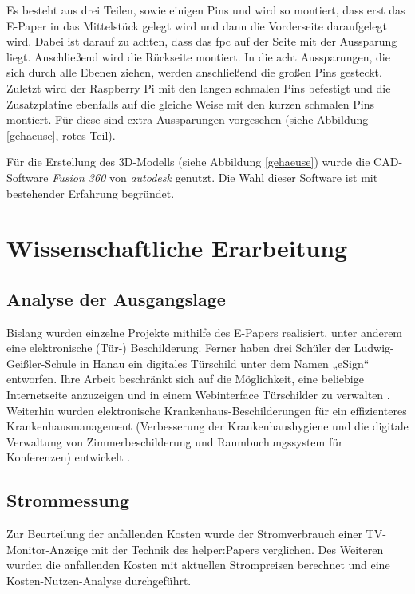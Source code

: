 \documentclass[10pt]{article}
\begin{document}
Es besteht aus drei Teilen, sowie einigen Pins und wird so montiert, dass erst das E-Paper in das Mittelstück gelegt wird und dann die Vorderseite daraufgelegt wird. Dabei ist darauf zu achten, dass das fpc auf der Seite mit der Aussparung liegt. Anschließend wird die Rückseite montiert. In die acht Aussparungen, die sich durch alle Ebenen ziehen, werden anschließend die großen Pins gesteckt. Zuletzt wird der Raspberry Pi mit den langen schmalen Pins befestigt und die Zusatzplatine ebenfalls auf die gleiche Weise mit den kurzen schmalen Pins montiert. Für diese sind extra Aussparungen vorgesehen (siehe Abbildung \ref{gehaeuse}, rotes Teil).

Für die Erstellung des 3D-Modells (siehe Abbildung \ref{gehaeuse})  wurde die CAD-Software \textit{Fusion 360} von \textit{autodesk} genutzt. Die Wahl dieser Software ist mit bestehender Erfahrung begründet.


\section{Wissenschaftliche Erarbeitung}
\subsection{Analyse der Ausgangslage}
Bislang wurden einzelne Projekte mithilfe des E-Papers realisiert, unter anderem eine elektronische (Tür-) Beschilderung. Ferner haben drei Schüler der Ludwig-Geißler-Schule in Hanau ein digitales Türschild unter dem Namen „eSign“ entworfen. Ihre Arbeit beschränkt sich auf die Möglichkeit, eine beliebige Internetseite anzuzeigen und in einem Webinterface Türschilder zu verwalten \cite{eSign}. 
Weiterhin wurden elektronische Krankenhaus-Beschilderungen für ein effizienteres Krankenhausmanagement (Verbesserung der Krankenhaushygiene und die digitale Verwaltung von Zimmerbeschilderung und Raumbuchungssystem für Konferenzen) entwickelt \cite{Management_im_Krankenhaus}. 

\subsection{Strommessung}
Zur Beurteilung der anfallenden Kosten wurde der Stromverbrauch einer TV-Monitor-Anzeige mit der Technik des helper:Papers verglichen. Des Weiteren wurden die anfallenden Kosten mit aktuellen Strompreisen berechnet und eine Kosten-Nutzen-Analyse durchgeführt. 
\end{document}
